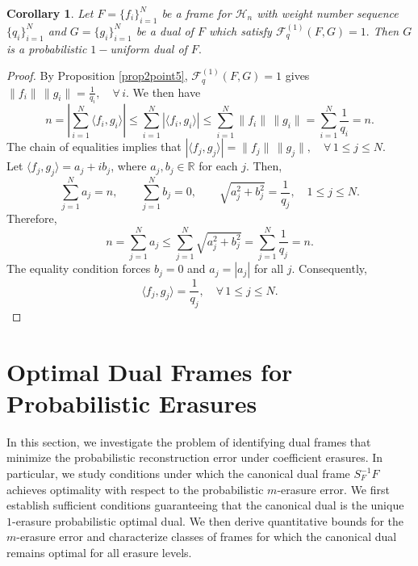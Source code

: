 \documentclass[final,1p,times]{elsarticle}
\newtheorem{cor}[thm]{Corollary}
\begin{document}
\begin{cor}
    Let $F = \{f_i\}_{i=1}^N$ be a frame for $\mathcal{H}_n$ with weight number sequence $\{q_i\}_{i=1}^N$  and $G = \{g_i\}_{i=1}^N$ be a dual of $F$ which satisfy $\mathcal{F}_{q}^{(1)}(F,G) = 1 .$ Then $G$ is a probabilistic $1-$uniform dual of $F.$
\end{cor}
\begin{proof}
 By Proposition \ref{prop2point5},  $\mathcal{F}_{q}^{(1)}(F,G) = 1 $  gives $\|f_i\|\,\|g_i\| = \frac{1}{q_i}, \quad \forall\, i.$ We then have
\[
n = \left|\sum_{i=1}^N \langle f_i , g_i \rangle \right| 
   \leq \sum_{i=1}^N \left| \langle f_i , g_i \rangle \right| 
   \leq \sum_{i=1}^N \|f_i\|\,\|g_i\|
   = \sum_{i=1}^N \frac{1}{q_i}
   = n.
\]
The chain of equalities implies that $|\langle f_j , g_j \rangle| = \|f_j\|\,\|g_j\|, \quad \forall\, 1 \leq j \leq N.$\\
Let $\langle f_j , g_j \rangle = a_j + i b_j$, where $a_j, b_j \in \mathbb{R}$ for each $j$.  
Then,
\[
\sum_{j=1}^N a_j = n, \qquad \sum_{j=1}^N b_j = 0, \qquad 
\sqrt{a_j^2 + b_j^2} = \frac{1}{q_j}, \quad 1 \leq j \leq N.
\]
Therefore,
\[
n = \sum_{j=1}^N a_j 
   \leq \sum_{j=1}^N \sqrt{a_j^2 + b_j^2}
   = \sum_{j=1}^N \frac{1}{q_j}
   = n.
\]
The equality condition forces $b_j = 0$ and $a_j = |a_j|$ for all $j$.  
Consequently,
\[
\langle f_j , g_j \rangle = \frac{1}{q_j}, \quad \forall\, 1 \leq j \leq N.
\]

\end{proof}









   
\section{Optimal Dual Frames for Probabilistic Erasures }

In this section, we investigate the problem of identifying dual frames that minimize the probabilistic reconstruction error under coefficient erasures. In particular, we study conditions under which the canonical dual frame $S_F^{-1}F$ achieves optimality with respect to the probabilistic $m$-erasure error. We first establish sufficient conditions guaranteeing that the canonical dual is the unique $1$-erasure probabilistic optimal dual. We then derive quantitative bounds for the $m$-erasure error and characterize classes of frames for which the canonical dual remains optimal for all erasure levels.
\end{document}
